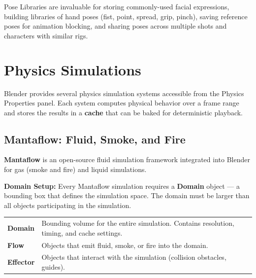 Pose Libraries are invaluable for storing commonly-used facial expressions, building libraries of hand poses (fist, point, spread, grip, pinch), saving reference poses for animation blocking, and sharing poses across multiple shots and characters with similar rigs.


\section{Physics Simulations}
\label{sec:physics}

Blender provides several physics simulation systems accessible from the Physics Properties panel. Each system computes physical behavior over a frame range and stores the results in a \textbf{cache} that can be baked for deterministic playback.

\subsection{Mantaflow: Fluid, Smoke, and Fire}
\label{subsec:mantaflow}

\textbf{Mantaflow} is an open-source fluid simulation framework integrated into Blender for gas (smoke and fire) and liquid simulations.

\textbf{Domain Setup:} Every Mantaflow simulation requires a \textbf{Domain} object --- a bounding box that defines the simulation space. The domain must be larger than all objects participating in the simulation.

\begin{center}
\begin{tabularx}{\textwidth}{L{2.5cm}X}
\toprule
{}
 &  \\
\midrule
\textbf{Domain} & Bounding volume for the entire simulation. Contains resolution, timing, and cache settings. \\
\textbf{Flow} & Objects that emit fluid, smoke, or fire into the domain. \\
\textbf{Effector} & Objects that interact with the simulation (collision obstacles, guides). \\
\bottomrule
\end{tabularx}
\end{center}

